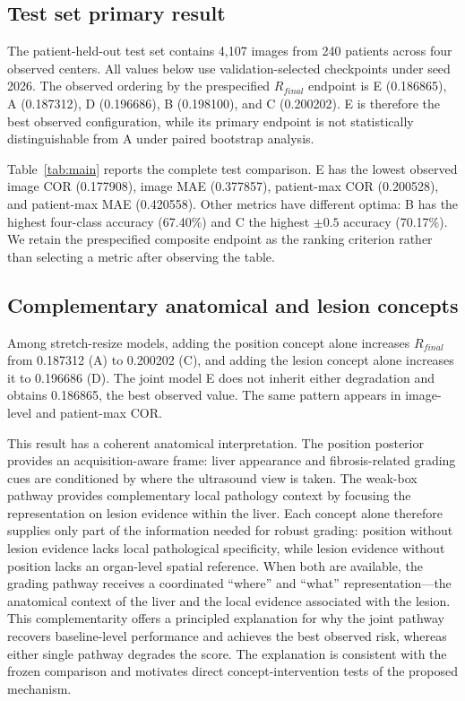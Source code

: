 \subsection{Test set primary result}
The patient-held-out test set contains 4,107 images from 240 patients across four observed centers. All values below use validation-selected checkpoints under seed 2026. The observed ordering by the prespecified $R_{final}$ endpoint is E (0.186865), A (0.187312), D (0.196686), B (0.198100), and C (0.200202). E is therefore the best observed configuration, while its primary endpoint is not statistically distinguishable from A under paired bootstrap analysis.

Table~\ref{tab:main} reports the complete test comparison. E has the lowest observed image COR (0.177908), image MAE (0.377857), patient-max COR (0.200528), and patient-max MAE (0.420558). Other metrics have different optima: B has the highest four-class accuracy (67.40\%) and C the highest $\pm0.5$ accuracy (70.17\%). We retain the prespecified composite endpoint as the ranking criterion rather than selecting a metric after observing the table.

\subsection{Complementary anatomical and lesion concepts}
Among stretch-resize models, adding the position concept alone increases $R_{final}$ from 0.187312 (A) to 0.200202 (C), and adding the lesion concept alone increases it to 0.196686 (D). The joint model E does not inherit either degradation and obtains 0.186865, the best observed value. The same pattern appears in image-level and patient-max COR.

This result has a coherent anatomical interpretation. The position posterior provides an acquisition-aware frame: liver appearance and fibrosis-related grading cues are conditioned by where the ultrasound view is taken. The weak-box pathway provides complementary local pathology context by focusing the representation on lesion evidence within the liver. Each concept alone therefore supplies only part of the information needed for robust grading: position without lesion evidence lacks local pathological specificity, while lesion evidence without position lacks an organ-level spatial reference. When both are available, the grading pathway receives a coordinated ``where'' and ``what'' representation—the anatomical context of the liver and the local evidence associated with the lesion. This complementarity offers a principled explanation for why the joint pathway recovers baseline-level performance and achieves the best observed risk, whereas either single pathway degrades the score. The explanation is consistent with the frozen comparison and motivates direct concept-intervention tests of the proposed mechanism.

